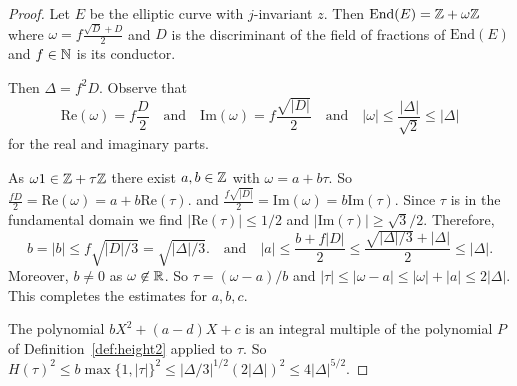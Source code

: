 \begin{proof}  
  Let $E$ be the elliptic curve with $j$-invariant $z$. Then
  $\mathrm{End}(E) = {\mathbb{Z}} + \omega {\mathbb{Z}}$ where $\omega = f
  \frac{\sqrt{D}+D}{2}$ and $D$ is the discriminant of the field of
  fractions of $\mathrm{End}(E)$ and $f\in{\mathbb{N}}$ is its conductor.

  Then $\Delta = f^2D$. Observe that
  \begin{equation*}
    \mathrm{Re}(\omega) = f\frac{D}{2} \quad\text{and}\quad
    \mathrm{Im}(\omega) = f\frac{\sqrt{|D|}}{2}
    \quad\text{and}\quad
    |\omega| \le \frac{|\Delta|}{\sqrt{2}}\le|\Delta|
  \end{equation*}
  for the real and imaginary parts. 

  As $\omega 1 \in{\mathbb{Z}}+\tau{\mathbb{Z}}$ there exist $a,b\in{\mathbb{Z}}$ with
  $\omega=a+b\tau$. So $\frac{fD}{2}=\mathrm{Re}(\omega) =
  a+b\mathrm{Re}(\tau)$. and $\frac{f\sqrt{|D|}}{2}=\mathrm{Im}(\omega)
  = b \mathrm{Im}(\tau)$. Since $\tau$ is in the fundamental domain we
  find $|\mathrm{Re}(\tau)|\le 1/2$ and $|\mathrm{Im}(\tau)|\ge
  \sqrt{3}/2$. Therefore,
  \begin{equation*}
    b=|b|\le {f \sqrt{|D|/3}} = \sqrt{|\Delta|/3}.
    \quad\text{and}\quad
    |a|\le \frac{b+f|D|}{2} \le \frac{\sqrt{|\Delta|/3} +
      |\Delta|}{2} \le |\Delta|. 
  \end{equation*}
  Moreover, $b\not=0$ as $\omega\not\in{\mathbb{R}}$. So
  $\tau = (\omega-a)/b$ and $|\tau|\le
  |\omega-a|\le|\omega|+|a| \le 2|\Delta| $.
  This completes the estimates for $a,b,c$. 


  The polynomial $bX^2+(a-d)X+c$ is an integral multiple of the
  polynomial $P$ of Definition~\ref{def:height2} applied to $\tau$.
  So $H(\tau)^2 \le b\max\{1,|\tau|\}^2 \le |\Delta/3|^{1/2}
  (2|\Delta|)^2 \le 4|\Delta|^{5/2}$. 
\end{proof}

